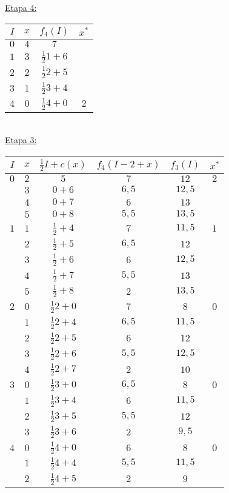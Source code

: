\documentclass[MIOP.tex]{subfiles}
\begin{document}
\begin{solucion}
\underline{Etapa 4:}\

\begin{tabular}{|c| c| c| c |}
\hline
$I$ & $x$ & $f_4(I)$ & $x^* $ \\
\hline
$0$ & $4$ & $7$ &  \\
\hline
$1$ & $3$ & $\frac{1}{2}1+6$ & \\
\hline
$2$ & $2$ & $\frac{1}{2}2+5$ & \\
\hline
$3$ & $1$ & $\frac{1}{2}3+4$ &  \\
\hline
$4$ & $0$ & $\frac{1}{2}4+0$ & $\boxed{2}$ \\
\hline
\end{tabular}\
\\

\underline{Etapa 3:}\

\begin{tabular}{|c| c| c| c | c| c|}
\hline
$I$ & $x$ & $\frac{1}{2}I+c(x)$ & $f_4(I-2+x)$ &  $f_3(I)$ & $x^* $ \\
\hline
$0$ & $2$ & $5$ & $7$  & $12$& $\boxed{2}$\\
\hline
 & $3$ & $0+6$ &$6,5$ & $12,5$ &\\
\hline
 & $4$ & $0+7$ & $6$ & $13$&\\
\hline
 & $5$ & $0+8$ & $5,5$ & $13,5$ & \\
\hline
\hline
$1$ & $1$ & $\frac{1}{2}+4$ & $7$  & $11,5$& $\boxed{1}$\\
\hline
 & $2$ & $\frac{1}{2}+5$ &$6,5$ & $12$ &\\
\hline
 & $3$ & $\frac{1}{2}+6$ & $6$ & $12,5$&\\
\hline
 & $4$ & $\frac{1}{2}+7$ & $5,5$ & $13$ & \\
\hline
 & $5$ & $\frac{1}{2}+8$ & $2$ & $13,5$ & \\
\hline
\hline
$2$ & $0$ & $\frac{1}{2}2+0$ & $7$  & $8$& $\boxed{0}$\\
\hline
 & $1$ & $\frac{1}{2}2+4$ &$6,5$ & $11,5$ &\\
\hline
 & $2$ & $\frac{1}{2}2+5$ &$6$ & $12$ &\\
\hline
 & $3$ & $\frac{1}{2}2+6$ & $5,5$ & $12,5$&\\
\hline
 & $4$ & $\frac{1}{2}2+7$ & $2$ & $10$ & \\
\hline
\hline
$3$ & $0$ & $\frac{1}{2}3+0$ & $6,5$  & $8$ & $\boxed{0}$\\
\hline
 & $1$ & $\frac{1}{2}3+4$ &$6$ & $11,5$ &\\
\hline
 & $2$ & $\frac{1}{2}3+5$ &$5,5$ & $12$ &\\
\hline
 & $3$ & $\frac{1}{2}3+6$ & $2$ & $9,5$&\\
 \hline
 \hline
 $4$ & $0$ & $\frac{1}{2}4+0$ & $6$  & $8$& $\boxed{0}$\\
\hline
 & $1$ & $\frac{1}{2}4+4$ &$5,5$ & $11,5$ &\\
\hline
 & $2$ & $\frac{1}{2}4+5$ &$2$ & $9$ &\\
 \hline
\end{tabular}\
\newpage


\end{solucion}
\end{document}
